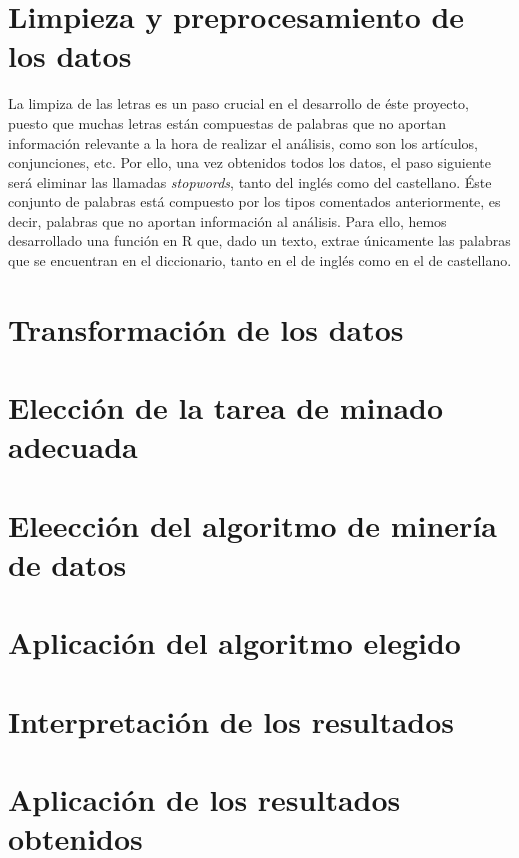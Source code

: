 \section{Limpieza y preprocesamiento de los datos}
La limpiza de las letras es un paso crucial en el desarrollo de éste proyecto, puesto que muchas letras están compuestas de palabras que no aportan información relevante a la hora de realizar el análisis, como son los artículos, conjunciones, etc. Por ello, una vez obtenidos todos los datos, el paso siguiente será eliminar las llamadas \textit{stopwords}, tanto del inglés como del castellano. Éste conjunto de palabras está compuesto por los tipos comentados anteriormente, es decir, palabras que no aportan información al análisis. Para ello, hemos desarrollado una función en R que, dado un texto, extrae únicamente las palabras que se encuentran en el diccionario, tanto en el de inglés como en el de castellano.

\section{Transformación de los datos}
\section{Elección de la tarea de minado adecuada}
\section{Eleección del algoritmo de minería de datos}
\section{Aplicación del algoritmo elegido}
\section{Interpretación de los resultados}
\section{Aplicación de los resultados obtenidos}